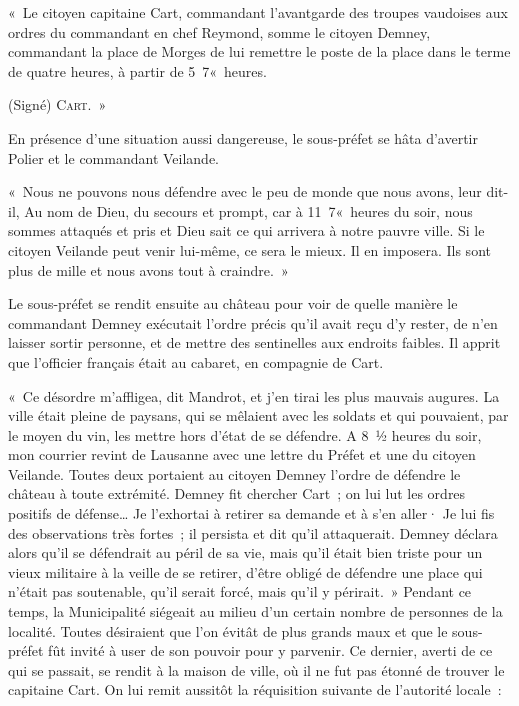 \documentclass[french,twoside]{book} %
\newenvironment{quoteblock}%
  {\begin{quoting}}
  {\end{quoting}}
\newenvironment{quotebar}{%
    \def\FrameCommand{{\color{rubric!10!}\vrule width 0.5em} \hspace{0.9em}}%
    \def\OuterFrameSep{\itemsep} %
    \MakeFramed {\advance\hsize-\width \FrameRestore}
  }%
  {%
    \endMakeFramed
  }
\renewenvironment{quoteblock}%
  {%
    \savenotes
    \setstretch{0.9}
    \normalfont
    \begin{quotebar}
  }
  {%
    \end{quotebar}
    \spewnotes
  }
\begin{document}
\begin{quoteblock}
 \noindent « Le citoyen capitaine Cart, commandant l’avantgarde des troupes vaudoises aux ordres du commandant en chef Reymond, somme le citoyen Demney, commandant la place de Morges de lui remettre le poste de la place dans le terme de quatre heures, à partir de 5 7« heures.\par
 (Signé) {\scshape Cart. »}
 \end{quoteblock}

\noindent En présence d’une situation aussi dangereuse, le sous-préfet se hâta d’avertir Polier et le commandant Veilande.\par

\begin{quoteblock}
 \noindent « Nous ne pouvons nous défendre avec le peu de monde que nous avons, leur dit-il, Au nom de Dieu, du secours et prompt, car à 11 7« heures du soir, nous sommes attaqués et pris et Dieu sait ce qui arrivera à notre pauvre ville. Si le citoyen Veilande peut venir lui-même, ce sera le mieux. Il en imposera. Ils sont plus de mille et nous avons tout à craindre. »
 \end{quoteblock}

\noindent Le sous-préfet se rendit ensuite au château pour voir de quelle manière le commandant Demney exécutait l’ordre précis qu’il avait reçu d’y rester, de n’en laisser sortir personne, et de mettre des sentinelles aux endroits faibles. Il apprit que l’officier français était au cabaret, en compagnie de Cart.\par
« Ce désordre m’affligea, dit Mandrot, et j’en tirai les plus mauvais augures. La ville était pleine de paysans, qui se mêlaient avec les soldats et qui pouvaient, par le moyen du vin, les mettre hors d’état de se défendre. A 8 ½ heures du soir, mon courrier revint de Lausanne avec une lettre du Préfet et une du citoyen Veilande. Toutes deux portaient au citoyen Demney l’ordre de défendre le château à toute extrémité. Demney fit chercher Cart ; on lui lut les ordres positifs de défense… Je l’exhortai à retirer sa demande et à s’en aller· Je lui fis des observations très fortes ; il persista et dit qu’il attaquerait. Demney déclara alors qu’il se défendrait au péril de sa vie, mais qu’il était bien triste pour un vieux militaire à la veille de se retirer, d’être obligé de défendre une place qui n’était pas soutenable, qu’il serait forcé, mais qu’il y périrait. » Pendant ce temps, la Municipalité siégeait au milieu d’un certain nombre de personnes de la localité. Toutes désiraient que l’on évitât de plus grands maux et que le sous-préfet fût invité à user de son pouvoir pour y parvenir. Ce dernier, averti de ce qui se passait, se rendit à la maison de ville, où il ne fut pas étonné de trouver le capitaine Cart. On lui remit aussitôt la réquisition suivante de l’autorité locale :\par
\end{document}
